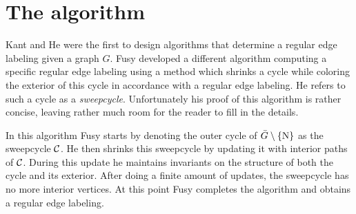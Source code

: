 
\section{The algorithm}
\thispagestyle{plain}
\label{s:algo}

  Kant and He \cite{Kant1997} were the first to design algorithms that determine a regular edge labeling given a graph $G$. Fusy \cite{Fusy2006} developed a different algorithm computing a specific regular edge labeling using a method which shrinks a cycle while coloring the exterior of this cycle in accordance with a regular edge labeling.
  He refers to such a cycle as a \emph{sweepcycle}.
  Unfortunately his proof of this algorithm is rather concise, leaving rather much room for the reader to fill in the details.

  In this algorithm Fusy starts by denoting the outer cycle of $\bar{G} \setminus \left\lbrace {\mathrm{N}} \right\rbrace$ as the sweepcycle $\mathcal{C}$. He then shrinks this sweepcycle by updating it with interior paths of $\mathcal{C}$. During this update he maintains invariants on the structure of both the cycle and its exterior.
  After doing a finite amount of updates, the sweepcycle has no more interior vertices. At this point Fusy completes the algorithm and obtains a regular edge labeling.

